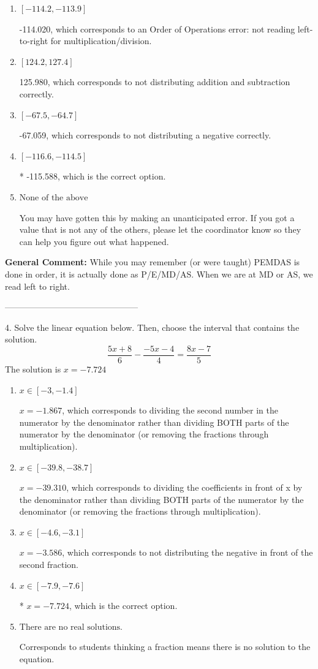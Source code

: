 \documentclass{extbook}[14pt]
\begin{document}
\begin{enumerate}[label=\Alph*.] 
\item $ [-114.2, -113.9] $ 

  -114.020, which corresponds to an Order of Operations error: not reading left-to-right for multiplication/division. 
\item $ [124.2, 127.4] $ 

  125.980, which corresponds to not distributing addition and subtraction correctly. 
\item $ [-67.5, -64.7] $ 

  -67.059, which corresponds to not distributing a negative correctly. 
\item $ [-116.6, -114.5] $ 

 * -115.588, which is the correct option. 
\item $ \text{None of the above} $ 

  You may have gotten this by making an unanticipated error. If you got a value that is not any of the others, please let the coordinator know so they can help you figure out what happened. 
\end{enumerate} 
 
\textbf{General Comment:} While you may remember (or were taught) PEMDAS is done in order, it is actually done as P/E/MD/AS. When we are at MD or AS, we read left to right. 

-----------------------------------------------

4. Solve the linear equation below. Then, choose the interval that contains the solution.
\[ \frac{5x + 8}{6} - \frac{-5x -4}{4} = \frac{8x -7}{5} \] 
The solution is $ x = -7.724 $ 

\begin{enumerate}[label=\Alph*.] 
\item $ x \in [-3, -1.4] $ 

  $x = -1.867$, which corresponds to dividing the second number in the numerator by the denominator rather than dividing BOTH parts of the numerator by the denominator (or removing the fractions through multiplication). 
\item $ x \in [-39.8, -38.7] $ 

  $x = -39.310$, which corresponds to dividing the coefficients in front of x by the denominator rather than dividing BOTH parts of the numerator by the denominator (or removing the fractions through multiplication). 
\item $ x \in [-4.6, -3.1] $ 

  $x = -3.586$, which corresponds to not distributing the negative in front of the second fraction. 
\item $ x \in [-7.9, -7.6] $ 

 * $x = -7.724$, which is the correct option. 
\item $ \text{There are no real solutions.} $ 

 Corresponds to students thinking a fraction means there is no solution to the equation. 
\end{enumerate} 
 
\end{document}
